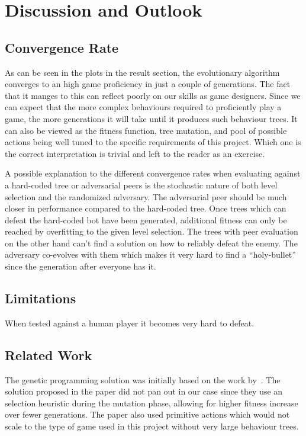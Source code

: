 \documentclass[a4paper, twocolumn]{article}
\begin{document}
    \section{Discussion and Outlook} \label{sec:discussion_and_outlook}

    \subsection*{Convergence Rate}

        As can be seen in the plots in the result section, the evolutionary algorithm converges to an high game proficiency in just a couple of generations. The fact that it manges to this can reflect poorly on our skills as game designers. Since we can expect that the more complex behaviours required to proficiently play a game, the more generations it will take until it produces such behaviour trees. It can also be viewed as the fitness function, tree mutation, and pool of possible actions being well tuned to the specific requirements of this project. Which one is the correct interpretation is trivial and left to the reader as an exercise. 

        A possible explanation to the different convergence rates when evaluating against a hard-coded tree or adversarial peers is the stochastic nature of both level selection and the randomized adversary. The adversarial peer should be much closer in performance compared to the hard-coded tree. Once trees which can defeat the hard-coded bot have been generated, additional fitness can only be reached by overfitting to the given level selection. The trees with peer evaluation on the other hand can't find a solution on how to reliably defeat the enemy. The adversary co-evolves with them which makes it very hard to find a ``holy-bullet'' since the generation after everyone has it.

    \subsection*{Limitations}

    When tested against a human player it becomes very hard to defeat.


    \subsection*{Related Work}

    The genetic programming solution was initially based on the work by~\cite{colledanchise2015learning}. The solution proposed in the paper did not pan out in our case since they use an selection heuristic during the mutation phase, allowing for higher fitness increase over fewer generations. The paper also used primitive actions which would not scale to the type of game used in this project without very large behaviour trees. 
\end{document}
